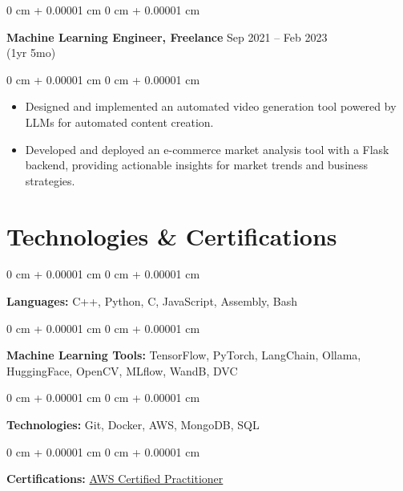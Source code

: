 \documentclass[10pt, letterpaper]{article}
\newenvironment{highlights}{
    \begin{itemize}[
        topsep=0.10 cm,
        parsep=0.10 cm,
        partopsep=0pt,
        itemsep=0pt,
        leftmargin=0 cm + 10pt
    ]
}{
    \end{itemize}
} %
\newenvironment{onecolentry}{
    \begin{adjustwidth}{
        0 cm + 0.00001 cm
    }{
        0 cm + 0.00001 cm
    }
}{
    \end{adjustwidth}
} %
\newenvironment{twocolentry}[2][]{
    \onecolentry
    \def\secondColumn{#2}
    \setcolumnwidth{\fill, 4.5 cm}
    \begin{paracol}{2}
}{
    \switchcolumn \raggedleft \secondColumn
    \end{paracol}
    \endonecolentry
} %
\begin{document}
        \vspace{0.7 cm}

        \begin{twocolentry}{
            Sep 2021 – Feb 2023\\ 
            (1yr 5mo)
        }
            \textbf{Machine Learning Engineer, Freelance }\end{twocolentry}

        \vspace{0.10 cm}
        \begin{onecolentry}
            \begin{highlights}
            \item Designed and implemented an automated video generation tool powered by LLMs for automated content creation.
            \item Developed and deployed an e-commerce market analysis tool with a Flask backend, providing actionable insights for market trends and business strategies.
            \end{highlights}
        \end{onecolentry}
    
    \section{Technologies \& Certifications}



        
        \begin{onecolentry}
            \textbf{Languages:} C++, Python, C, JavaScript, Assembly, Bash
        \end{onecolentry}

        \vspace{0.2 cm}

        \begin{onecolentry}
            \textbf{Machine Learning Tools:} TensorFlow, PyTorch, LangChain, Ollama, HuggingFace, OpenCV, MLflow, WandB, DVC
        \end{onecolentry}

        \vspace{0.2 cm}
        
        \begin{onecolentry}
            \textbf{Technologies:} Git, Docker, AWS, MongoDB, SQL
        \end{onecolentry}

        \vspace{0.2 cm}
        
        \begin{onecolentry}
            \textbf{Certifications:}             \href{https://www.credly.com/badges/858a6edb-6ccd-418d-a949-51d601372cca/public_url}{AWS Certified Practitioner}
            
        \end{onecolentry}
\end{document}
